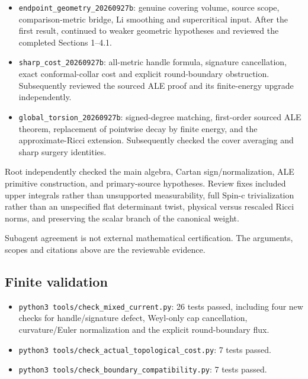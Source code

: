 \documentclass[
  10pt,
]{article}
\providecommand{\tightlist}{%
  \setlength{\itemsep}{0pt}\setlength{\parskip}{0pt}}
\begin{document}
\begin{itemize}
\tightlist
\item
  \nolinkurl{endpoint_geometry_20260927b}: genuine covering volume,
  source scope, comparison-metric bridge, Li smoothing and supercritical
  input. After the first result, continued to weaker geometric
  hypotheses and reviewed the completed Sections 1--4.1.
\item
  \nolinkurl{sharp_cost_20260927b}: all-metric handle formula, signature
  cancellation, exact conformal-collar cost and explicit round-boundary
  obstruction. Subsequently reviewed the sourced ALE proof and its
  finite-energy upgrade independently.
\item
  \nolinkurl{global_torsion_20260927b}: signed-degree matching,
  first-order sourced ALE theorem, replacement of pointwise decay by
  finite energy, and the approximate-Ricci extension. Subsequently
  checked the cover averaging and sharp surgery identities.
\end{itemize}

Root independently checked the main algebra, Cartan sign/normalization,
ALE primitive construction, and primary-source hypotheses. Review fixes
included upper integrals rather than unsupported measurability, full
Spin-c trivialization rather than an unspecified flat determinant twist,
physical versus rescaled Ricci norms, and preserving the scalar branch
of the canonical weight.

Subagent agreement is not external mathematical certification. The
arguments, scopes and citations above are the reviewable evidence.

\hypertarget{finite-validation}{%
\subsection{Finite validation}\label{finite-validation}}

\begin{itemize}
\tightlist
\item
  \texttt{python3\ tools/\nolinkurl{check_mixed_current.py}}: 26 tests passed,
  including four new checks for handle/signature defect, Weyl-only cap
  cancellation, curvature/Euler normalization and the explicit
  round-boundary flux.
\item
  \texttt{python3\ tools/\nolinkurl{check_actual_topological_cost.py}}: 7 tests
  passed.
\item
  \texttt{python3\ tools/\nolinkurl{check_boundary_compatibility.py}}: 7 tests
  passed.
\end{itemize}
\end{document}
